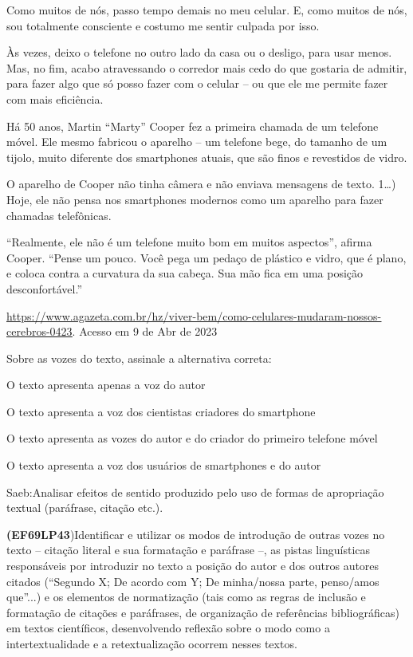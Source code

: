 {{\begin{escolha}
Como muitos de nós, passo tempo demais no meu celular. E, como muitos de
nós, sou totalmente consciente e costumo me sentir culpada por isso.

Às vezes, deixo o telefone no outro lado da casa ou o desligo, para usar
menos. Mas, no fim, acabo atravessando o corredor mais cedo do que
gostaria de admitir, para fazer algo que só posso fazer com o celular --
ou que ele me permite fazer com mais eficiência.

Há 50 anos, Martin ``Marty'' Cooper fez a primeira chamada de um
telefone móvel. Ele mesmo fabricou o aparelho -- um telefone bege, do
tamanho de um tijolo, muito diferente dos smartphones atuais, que são
finos e revestidos de vidro.

O aparelho de Cooper não tinha câmera e não enviava mensagens de texto.
1\ldots) Hoje, ele não pensa nos smartphones modernos como um aparelho
para fazer chamadas telefônicas.

``Realmente, ele não é um telefone muito bom em muitos aspectos'',
afirma Cooper. ``Pense um pouco. Você pega um pedaço de plástico e
vidro, que é plano, e coloca contra a curvatura da sua cabeça. Sua mão
fica em uma posição desconfortável.''

\href{https://www.agazeta.com.br/hz/viver-bem/como-celulares-mudaram-nossos-cerebros-0423}{\uline{https://www.agazeta.com.br/hz/viver-bem/como-celulares-mudaram-nossos-cerebros-0423}}.
Acesso em 9 de Abr de 2023

Sobre as vozes do texto, assinale a alternativa correta:

\begin{escolha}

\item
  O texto apresenta apenas a voz do autor
\item
  O texto apresenta a voz dos cientistas criadores do smartphone
\item
  O texto apresenta as vozes do autor e do criador do primeiro telefone
  móvel
\item
  O texto apresenta a voz dos usuários de smartphones e do autor
\end{escolha}

Saeb:Analisar efeitos de sentido produzido pelo uso de formas de
apropriação textual (paráfrase, citação etc.).

\textbf{(EF69LP43})Identificar e utilizar os modos de introdução de
outras vozes no texto -- citação literal e sua formatação e paráfrase
--, as pistas linguísticas responsáveis por introduzir no texto a
posição do autor e dos outros autores citados (``Segundo X; De acordo
com Y; De minha/nossa parte, penso/amos que''...) e os elementos de
normatização (tais como as regras de inclusão e formatação de citações e
paráfrases, de organização de referências bibliográficas) em textos
científicos, desenvolvendo reflexão sobre o modo como a
intertextualidade e a retextualização ocorrem nesses textos.


\end{escolha}}}
